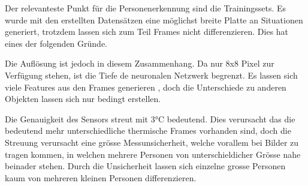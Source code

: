 Der relevanteste Punkt für die Personenerkennung sind die Trainingssets. Es wurde mit den erstellten Datensätzen eine möglichst breite Platte an Situationen generiert, trotzdem lassen sich zum Teil Frames nicht differenzieren. Dies hat eines der folgenden Gründe.

Die Auflösung ist jedoch in diesem Zusammenhang. Da nur 8x8 Pixel zur Verfügung stehen, ist die Tiefe de neuronalen Netzwerk begrenzt. Es lassen sich viele Features aus den Frames generieren , doch die Unterschiede zu anderen Objekten lassen sich nur bedingt erstellen.

Die Genauigkeit des Sensors streut mit 3°C bedeutend. Dies verursacht das die bedeutend mehr unterschiedliche thermische Frames vorhanden sind, doch die Streuung verursacht eine grösse Messunsicherheit, welche vorallem bei Bilder zu tragen kommen, in welchen mehrere Personen von unterschieldicher Grösse nahe beinader stehen. Durch die Unsicherheit lassen sich einzelne grosse Personen kaum von mehreren kleinen Personen differenzieren.






